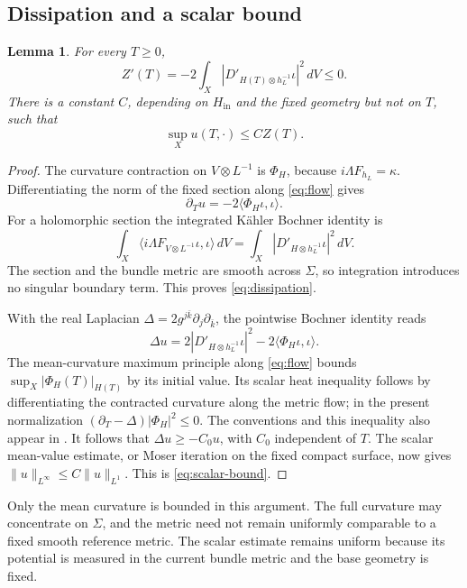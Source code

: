 \documentclass[11pt]{amsart}
\newtheorem{lemma}[theorem]{Lemma}
\theoremstyle{definition}
\theoremstyle{remark}
\begin{document}
\subsection{Dissipation and a scalar bound}
\begin{lemma}\label{lem:dissipation}
For every $T\ge0$,
\begin{equation}\label{eq:dissipation}
 Z'(T)=-2\int_X|D'_{H(T)\otimes h_L^{-1}}\iota|^2\,dV\le0.
\end{equation}
There is a constant $C$, depending on $H_{\mathrm{in}}$ and the fixed
geometry but not on $T$, such that
\begin{equation}\label{eq:scalar-bound}
 \sup_X u(T,\cdot)\le C Z(T).
\end{equation}
\end{lemma}

\begin{proof}
The curvature contraction on $V\otimes L^{-1}$ is $\Phi_H$, because
$i\Lambda F_{h_L}=\kappa$. Differentiating the norm of the fixed section
along \eqref{eq:flow} gives
\[
 \partial_Tu=-2\langle\Phi_H\iota,\iota\rangle.
\]
For a holomorphic section the integrated K\"ahler Bochner identity is
\[
 \int_X\langle i\Lambda F_{V\otimes L^{-1}}\iota,\iota\rangle\,dV
 =\int_X|D'_{H\otimes h_L^{-1}}\iota|^2\,dV.
\]
The section and the bundle metric are smooth across $\Sigma$, so integration
introduces no singular boundary term. This proves
\eqref{eq:dissipation}.

With the real Laplacian $\Delta=2g^{j\bar k}\partial_j\partial_{\bar k}$,
the pointwise Bochner identity reads
\[
 \Delta u=2|D'_{H\otimes h_L^{-1}}\iota|^2
                -2\langle\Phi_H\iota,\iota\rangle.
\]
The mean-curvature maximum principle along \eqref{eq:flow} bounds
$\sup_X|\Phi_H(T)|_{H(T)}$ by its initial value. Its scalar heat
inequality follows by differentiating the contracted curvature along
the metric flow; in the present normalization
$(\partial_T-\Delta)|\Phi_H|^2\le0$.
The conventions and this inequality also appear in
\cite[equations~(1.5)--(1.6), (3.78)]{lzz2016}.
It follows that $\Delta u\ge-C_0u$, with $C_0$ independent of $T$.
The scalar mean-value estimate, or Moser iteration on the fixed compact
surface, now gives $\|u\|_{L^\infty}\le C\|u\|_{L^1}$.
This is \eqref{eq:scalar-bound}.
\end{proof}

Only the mean curvature is bounded in this argument. The full curvature
may concentrate on $\Sigma$, and the metric need not remain uniformly comparable
to a fixed smooth reference metric. The scalar estimate remains uniform
because its potential is measured in the current bundle metric and the
base geometry is fixed.
\end{document}
